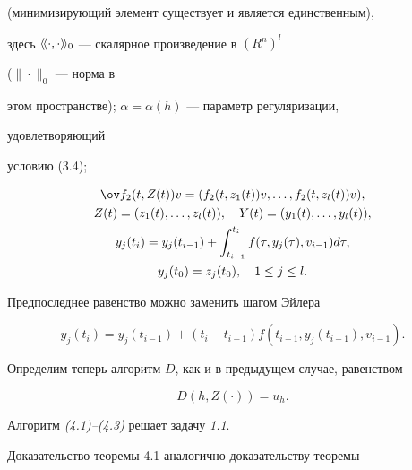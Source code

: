 (минимизирующий элемент существует и является единственным), 


здесь $\langle\!\langle\cdot,\cdot\rangle\!\rangle_0$ --- скалярное произведение в $(R^n)^l$ 


($\|\cdot\|_0$ --- норма в 


этом пространстве); $\alpha=\alpha(h)$ --- параметр регуляризации, 


удовлетворяющий 


условию (3.4); 


\begin{gather*} 


\ov f_2(t,Z(t))v=(f_2(t,z_1(t))v,\dotsc,f_2(t,z_l(t))v), \\ 


Z(t)=(z_1(t),\dotsc,z_l(t)),\quad 


Y(t)=(y_1(t),\dotsc,y_l(t)), \\ 


y_j(t_i)=y_j(t_{i-1})+\int^{t_i}_{t_{i-1}} 


f(\tau,y_j(\tau),v_{i-1})d\tau, \\ 


y_j(t_0)=z_j(t_0),\quad 1\le j\le l. 


\end{gather*} 


Предпоследнее равенство можно заменить шагом Эйлера 


$$ 


y_j(t_i)=y_j(t_{i-1})+(t_i-t_{i-1}) 


f(t_{i-1},y_j(t_{i-1}),v_{i-1}). 


$$ 


 


Определим теперь алгоритм $D$, как и в предыдущем случае, равенством 


\begin{equation} 


D(h,Z(\cdot))=u_h. 


\end{equation} 


 


\begin{thms} 


Алгоритм {\em (4.1)--(4.3)} решает задачу {\em 1.1}. 


\end{thms} 


 


Доказательство теоремы 4.1 аналогично доказательству теоремы 


